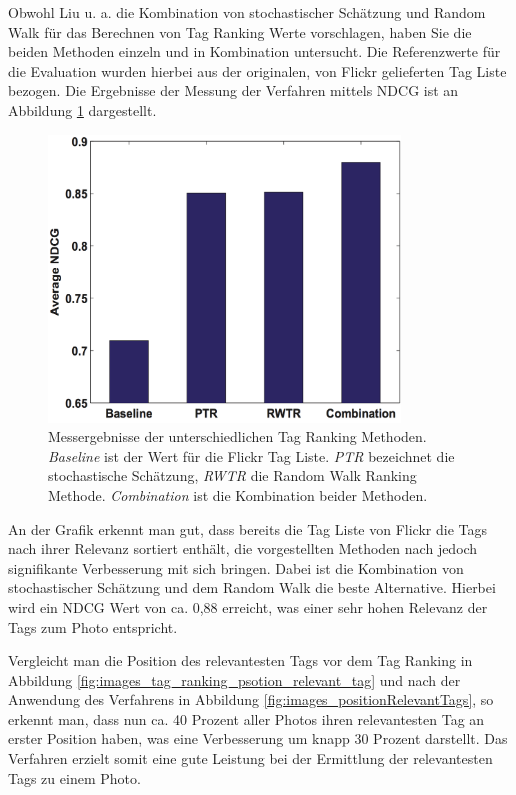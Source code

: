 Obwohl Liu u. a. die Kombination von stochastischer Schätzung und Random Walk für das Berechnen von Tag Ranking Werte vorschlagen, haben Sie die beiden Methoden einzeln und in Kombination untersucht. Die Referenzwerte für die Evaluation wurden hierbei aus der originalen, von Flickr gelieferten Tag Liste bezogen. Die Ergebnisse der Messung der Verfahren mittels NDCG ist an Abbildung \ref{fig:images_ndcgAll} dargestellt.
\begin{figure}[htbp]
  \centering
    \includegraphics[height=3in]{images/ndcgAll.png}
  \caption{Messergebnisse der unterschiedlichen Tag Ranking Methoden. \emph{Baseline} ist der Wert für die Flickr Tag Liste. \emph{PTR} bezeichnet die stochastische Schätzung, \emph{RWTR} die Random Walk Ranking Methode. \emph{Combination} ist die Kombination beider Methoden.}
  \label{fig:images_ndcgAll}
\end{figure}

An der Grafik erkennt man gut, dass bereits die Tag Liste von Flickr die Tags nach ihrer Relevanz sortiert enthält, die vorgestellten Methoden nach \cite{ranking} jedoch signifikante Verbesserung mit sich bringen. Dabei ist die Kombination von stochastischer Schätzung und dem Random Walk die beste Alternative. Hierbei wird ein NDCG Wert von ca. 0,88 erreicht, was einer sehr hohen Relevanz der Tags zum Photo entspricht.

Vergleicht man die Position des relevantesten Tags vor dem Tag Ranking in Abbildung \ref{fig:images_tag_ranking_psotion_relevant_tag} und nach der Anwendung des Verfahrens in Abbildung \ref{fig:images_positionRelevantTags}, so erkennt man, dass nun ca. 40 Prozent aller Photos ihren relevantesten Tag an erster Position haben, was eine Verbesserung um knapp 30 Prozent darstellt. Das Verfahren erzielt somit eine gute Leistung bei der Ermittlung der relevantesten Tags zu einem Photo.

